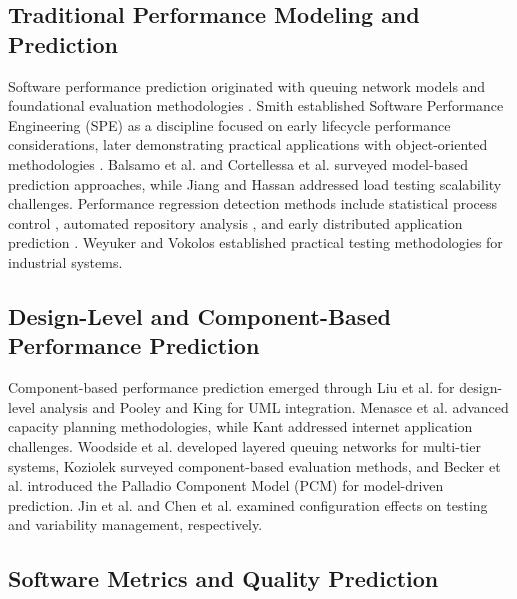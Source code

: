 \documentclass[technologies,article,submit,pdftex,moreauthors]{Definitions/mdpi}
\begin{document}
\subsection{Traditional Performance Modeling and Prediction}\label{sec:rw_traditional}

Software performance prediction originated with queuing network models \citep{lazowska1984, reiser1980} and foundational evaluation methodologies \citep{ferrari1978, sauer1981, jain1991}. Smith \citep{smith1990} established Software Performance Engineering (SPE) as a discipline focused on early lifecycle performance considerations, later demonstrating practical applications with object-oriented methodologies \citep{smith2002}. Balsamo et al. \citep{balsamo2004} and Cortellessa et al. \citep{cortellessa2011} surveyed model-based prediction approaches, while Jiang and Hassan \citep{jiang2015} addressed load testing scalability challenges. Performance regression detection methods include statistical process control \citep{nguyen2012}, automated repository analysis \citep{foo2010}, and early distributed application prediction \citep{hplabs2006}. Weyuker and Vokolos \citep{weyuker2000} established practical testing methodologies for industrial systems.

\subsection{Design-Level and Component-Based Performance Prediction}\label{sec:rw_component}

Component-based performance prediction emerged through Liu et al. \citep{liu2005} for design-level analysis and Pooley and King \citep{pooley1999} for UML integration. Menasce et al. \citep{menasce2004} advanced capacity planning methodologies, while Kant \citep{kant1992} addressed internet application challenges. Woodside et al. \citep{woodside2007} developed layered queuing networks for multi-tier systems, Koziolek \citep{koziolek2010} surveyed component-based evaluation methods, and Becker et al. \citep{becker2009} introduced the Palladio Component Model (PCM) for model-driven prediction. Jin et al. \citep{jin2014} and Chen et al. \citep{chen2009} examined configuration effects on testing and variability management, respectively.

\subsection{Software Metrics and Quality Prediction}\label{sec:rw_metrics}
\end{document}
